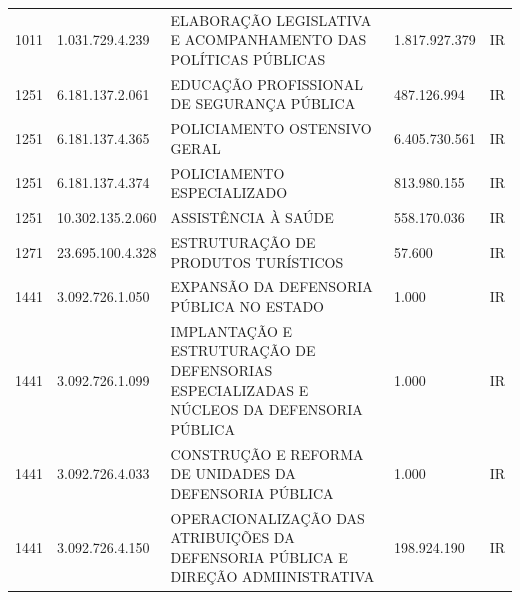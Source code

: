 \documentclass{article}
\begin{document}
\begin{longtable}[c]{m{1cm}|m{2cm}|m{10cm}|m{2cm}|m{1cm}}
\hline\hline
\multicolumn{1}{C{1cm}|}{1011} & \multicolumn{1}{C{2cm}|}{1.031.729.4.239} & \multicolumn{1}{L{10cm}|}{ELABORAÇÃO LEGISLATIVA E ACOMPANHAMENTO DAS POLÍTICAS PÚBLICAS} & \multicolumn{1}{R{2cm}|}{1.817.927.379} & \multicolumn{1}{C{1cm}}{IR} \\
\multicolumn{1}{C{1cm}|}{1251} & \multicolumn{1}{C{2cm}|}{6.181.137.2.061} & \multicolumn{1}{L{10cm}|}{EDUCAÇÃO PROFISSIONAL DE SEGURANÇA PÚBLICA} & \multicolumn{1}{R{2cm}|}{487.126.994} & \multicolumn{1}{C{1cm}}{IR} \\
\multicolumn{1}{C{1cm}|}{1251} & \multicolumn{1}{C{2cm}|}{6.181.137.4.365} & \multicolumn{1}{L{10cm}|}{POLICIAMENTO OSTENSIVO GERAL} & \multicolumn{1}{R{2cm}|}{6.405.730.561} & \multicolumn{1}{C{1cm}}{IR} \\
\multicolumn{1}{C{1cm}|}{1251} & \multicolumn{1}{C{2cm}|}{6.181.137.4.374} & \multicolumn{1}{L{10cm}|}{POLICIAMENTO ESPECIALIZADO} & \multicolumn{1}{R{2cm}|}{813.980.155} & \multicolumn{1}{C{1cm}}{IR} \\
\multicolumn{1}{C{1cm}|}{1251} & \multicolumn{1}{C{2cm}|}{10.302.135.2.060} & \multicolumn{1}{L{10cm}|}{ASSISTÊNCIA À SAÚDE} & \multicolumn{1}{R{2cm}|}{558.170.036} & \multicolumn{1}{C{1cm}}{IR} \\
\multicolumn{1}{C{1cm}|}{1271} & \multicolumn{1}{C{2cm}|}{23.695.100.4.328} & \multicolumn{1}{L{10cm}|}{ESTRUTURAÇÃO DE PRODUTOS TURÍSTICOS} & \multicolumn{1}{R{2cm}|}{57.600} & \multicolumn{1}{C{1cm}}{IR} \\
\multicolumn{1}{C{1cm}|}{1441} & \multicolumn{1}{C{2cm}|}{3.092.726.1.050} & \multicolumn{1}{L{10cm}|}{EXPANSÃO DA DEFENSORIA PÚBLICA NO ESTADO} & \multicolumn{1}{R{2cm}|}{1.000} & \multicolumn{1}{C{1cm}}{IR} \\
\multicolumn{1}{C{1cm}|}{1441} & \multicolumn{1}{C{2cm}|}{3.092.726.1.099} & \multicolumn{1}{L{10cm}|}{IMPLANTAÇÃO E ESTRUTURAÇÃO DE DEFENSORIAS ESPECIALIZADAS E NÚCLEOS DA DEFENSORIA PÚBLICA} & \multicolumn{1}{R{2cm}|}{1.000} & \multicolumn{1}{C{1cm}}{IR} \\
\multicolumn{1}{C{1cm}|}{1441} & \multicolumn{1}{C{2cm}|}{3.092.726.4.033} & \multicolumn{1}{L{10cm}|}{CONSTRUÇÃO E REFORMA DE UNIDADES DA DEFENSORIA PÚBLICA} & \multicolumn{1}{R{2cm}|}{1.000} & \multicolumn{1}{C{1cm}}{IR} \\
\multicolumn{1}{C{1cm}|}{1441} & \multicolumn{1}{C{2cm}|}{3.092.726.4.150} & \multicolumn{1}{L{10cm}|}{OPERACIONALIZAÇÃO DAS ATRIBUIÇÕES DA DEFENSORIA PÚBLICA E DIREÇÃO ADMIINISTRATIVA} & \multicolumn{1}{R{2cm}|}{198.924.190} & \multicolumn{1}{C{1cm}}{IR} \\

\end{longtable}
\end{document}
